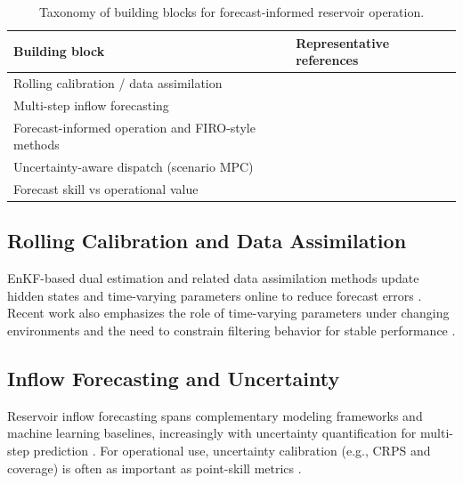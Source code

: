 \documentclass[conference]{IEEEtran}
\begin{document}
\begin{table}[t]
\centering
\caption{Taxonomy of building blocks for forecast-informed reservoir operation.}
\label{tab:taxonomy}
{\setlength{\tabcolsep}{3pt}\small
\begin{tabular}{p{}p{}}
\toprule
Building block & Representative references \\
\midrule
Rolling calibration / data assimilation & \cite{moradkhani2005dual,evensen2003ensemble,maxwell2018constraining,xiong2019identifying} \\
Multi-step inflow forecasting & \cite{gragne2015improving,kratzert2018rainfall,kratzert2019learning,fan2023explainable} \\
Forecast-informed operation and FIRO-style methods & \cite{yang2019real,zarei2021machine} \\
Uncertainty-aware dispatch (scenario MPC) & \cite{liu2020reservoir,cestari2023scenario,mayne2000constrained} \\
Forecast skill vs operational value & \cite{turner2017complex} \\
\bottomrule
\end{tabular}}
\end{table}

\subsection{Rolling Calibration and Data Assimilation}
EnKF-based dual estimation and related data assimilation methods update hidden states and
time-varying parameters online to reduce forecast errors \cite{moradkhani2005dual,evensen2003ensemble}.
Recent work also emphasizes the role of time-varying parameters under changing environments
and the need to constrain filtering behavior for stable performance \cite{xiong2019identifying,maxwell2018constraining}.

\subsection{Inflow Forecasting and Uncertainty}
Reservoir inflow forecasting spans complementary modeling frameworks and machine learning
baselines, increasingly with uncertainty quantification for multi-step prediction
\cite{gragne2015improving,kratzert2018rainfall,kratzert2019learning,fan2023explainable}.
For operational use, uncertainty calibration (e.g., CRPS and coverage) is often as important
as point-skill metrics \cite{gneiting2007strictly}.
\end{document}
